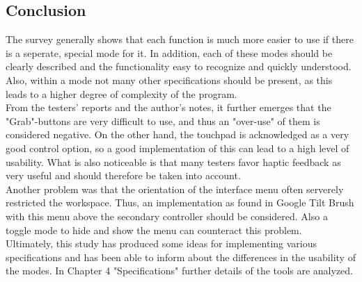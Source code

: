 \documentclass{report}
\begin{document}
		\subsection{Conclusion}
		\startsubsection
			The survey generally shows that each function is much more easier to use if there is a seperate, special mode for it. In addition, each of these modes should be clearly described and the functionality easy to recognize and quickly understood. Also, within a mode not many other specifications should be present, as this leads to a higher degree of complexity of the program. \\
			From the testers' reports and the author's notes, it further emerges that the "Grab"-buttons are very difficult to use, and thus an "over-use" of them is considered negative. On the other hand, the touchpad is acknowledged as a very good control option, so a good implementation of this can lead to a high level of usability. What is also noticeable is that many testers favor haptic feedback as very useful and should therefore be taken into account. \\
			Another problem was that the orientation of the interface menu often serverely restricted the workspace. Thus, an implementation as found in Google Tilt Brush with this menu above the secondary controller should be considered. Also a toggle mode to hide and show the menu can counteract this problem. \\
			Ultimately, this study has produced some ideas for implementing various specifications and has been able to inform about the differences in the usability of the modes. In Chapter 4 "Specifications" further details of the tools are analyzed.
		\closesection
	\closesection
	
\end{document}

